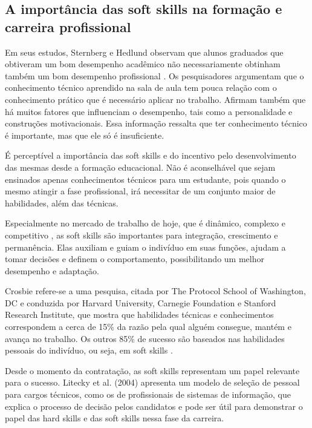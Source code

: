 	
\subsection{A importância das soft skills na formação e carreira profissional}
\label{subsec:ss-importance}

Em seus estudos, Sternberg e Hedlund observam que alunos graduados que obtiveram um bom desempenho acadêmico não necessariamente obtinham também um bom desempenho profissional \cite{sternberg:02}. Os pesquisadores argumentam que o conhecimento técnico aprendido na sala de aula tem pouca relação com o conhecimento prático que é necessário aplicar no trabalho. Afirmam também que há muitos fatores que influenciam o desempenho, tais como a personalidade e construções motivacionais. Essa informação ressalta que ter conhecimento técnico é importante, mas que ele só é insuficiente. 

É perceptível a importância das soft skills e do incentivo pelo desenvolvimento das mesmas desde a formação educacional. Não é aconselhável que sejam ensinados apenas conhecimentos técnicos para um estudante, pois quando o mesmo atingir a fase profissional, irá necessitar de um conjunto maior de habilidades, além das técnicas.

Especialmente no mercado de trabalho de hoje, que é dinâmico, complexo e competitivo \cite{joseph:10}, as soft skills são importantes para integração, crescimento e permanência. Elas auxiliam e guiam o indivíduo em suas funções, ajudam a tomar decisões e definem o comportamento, possibilitando um melhor desempenho e adaptação. 

Crosbie refere-se a uma pesquisa, citada por The Protocol School of Washington, DC e conduzida por Harvard University, Carnegie Foundation e Stanford Research Institute, que mostra que habilidades técnicas e conhecimentos correspondem a cerca de 15\% da razão pela qual alguém consegue, mantém e avança no trabalho. Os outros 85\% de sucesso são baseados nas habilidades pessoais do indivíduo, ou seja, em soft skills \cite{crosbie:05}.

Desde o momento da contratação, as soft skills representam um papel relevante para o sucesso. Litecky et al. (2004)\nocite{litecky:04} apresenta um modelo de seleção de pessoal para cargos técnicos, como os de profissionais de sistemas de informação, que explica o processo de decisão pelos candidatos e pode ser útil para demonstrar o papel das hard skills e das soft skills nessa fase da carreira.


